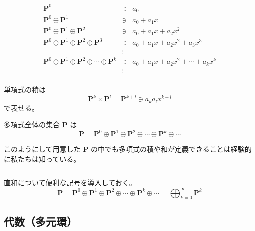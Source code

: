 \documentclass[uplatex,a4j,12pt,dvipdfmx]{jsarticle}
\begin{document}
\[
	\begin{array}{rcl}
		\mathbf{P}^{0}                                                                                 & \ni    & a_{0}                                                \\
		\mathbf{P}^{0} \oplus \mathbf{P}^{1}                                                           & \ni    & a_{0} + a_{1} x                                      \\
		\mathbf{P}^{0} \oplus \mathbf{P}^{1} \oplus \mathbf{P}^{2}                                     & \ni    & a_{0} + a_{1} x + a_{2} x^{2}                        \\
		\mathbf{P}^{0} \oplus \mathbf{P}^{1} \oplus \mathbf{P}^{2} \oplus \mathbf{P}^{3}               & \ni    & a_{0} + a_{1} x + a_{2} x^{2} + a_{3} x^{3}          \\
		                                                                                               & \vdots &                                                      \\
		\mathbf{P}^{0} \oplus \mathbf{P}^{1} \oplus \mathbf{P}^{2} \oplus \cdots \oplus \mathbf{P}^{k} & \ni    & a_{0} + a_{1} x + a_{2} x^{2} + \cdots + a_{k} x^{k} \\
		                                                                                               & \vdots &                                                      \\
	\end{array}
\]

単項式の積は
$$
	\mathbf{P}^{k} \times \mathbf{P}^{l} = \mathbf{P}^{k+l} \ni a_{k} a_{l} x^{k+l}
$$
で表せる。

多項式全体の集合 $\mathbf{P}$ は
$$
	\mathbf{P}
	=
	\mathbf{P}^{0} \oplus \mathbf{P}^{1} \oplus \mathbf{P}^{2} \oplus \cdots \oplus \mathbf{P}^{k} \oplus \cdots
$$

このようにして用意した $\mathbf{P}$ の中でも多項式の積や和が定義できることは経験的に私たちは知っている。

${}$

直和について便利な記号を導入しておく。
$$
	\mathbf{P}
	=
	\mathbf{P}^{0} \oplus \mathbf{P}^{1} \oplus \mathbf{P}^{2} \oplus \cdots \oplus \mathbf{P}^{k} \oplus \cdots
	=
	\displaystyle \bigoplus_{k=0}^{\infty} \mathbf{P}^{k}
$$

\subsection{代数（多元環）}
\end{document}
